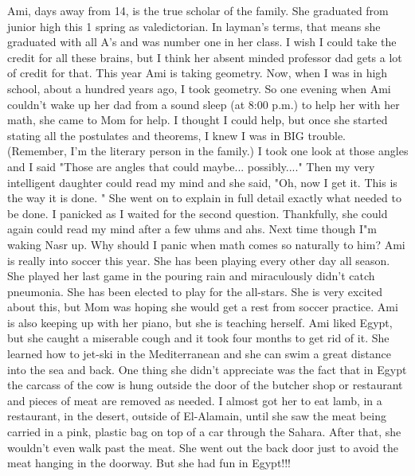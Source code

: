 Ami, days away from 14, is the true scholar of the family. She graduated from junior high this 1 spring as valedictorian. In layman's terms,
that means she graduated with all A's and was number one in her class. I wish I could take the credit for all these brains, but I think her
absent minded professor dad gets a lot of credit for that. This year Ami is taking geometry. Now, when I was in high school, about a hundred
years ago, I took geometry. So one evening when Ami couldn't wake up her dad from a sound sleep (at 8:00 p.m.) to help her with her math, she
came to Mom for help. I thought I could help, but once she started stating all the postulates and theorems, I knew I was in BIG trouble.
(Remember, I'm the literary person in the family.) I took one look at those angles and I said "Those are angles that could maybe...
possibly...." Then my very intelligent daughter could read my mind and she said, "Oh, now I get it. This is the way it is done. " She went on to
explain in full detail exactly what needed to be done. I panicked as I waited for the second question. Thankfully, she could again could read my
mind after a few uhms and ahs. Next time though I"m waking Nasr up. Why should I panic when math comes so naturally to him? Ami is really into
soccer this year. She has been playing every other day all season. She played her last game in the pouring rain and miraculously didn't catch
pneumonia. She has been elected to play for the all-stars. She is very excited about this, but Mom was hoping she would get a rest from soccer
practice. Ami is also keeping up with her piano, but she is teaching herself. Ami liked Egypt, but she caught a miserable cough and it took four
months to get rid of it. She learned how to jet-ski in the Mediterranean and she can swim a great distance into the sea and back. One thing she
didn't appreciate was the fact that in Egypt the carcass of the cow is hung outside the door of the butcher shop or restaurant and pieces of
meat are removed as needed. I almost got her to eat lamb, in a restaurant, in the desert, outside of El-Alamain, until she saw the meat being
carried in a pink, plastic bag on top of a car through the Sahara. After that, she wouldn't even walk past the meat. She went out the back door
just to avoid the meat hanging in the doorway. But she had fun in Egypt!!!

